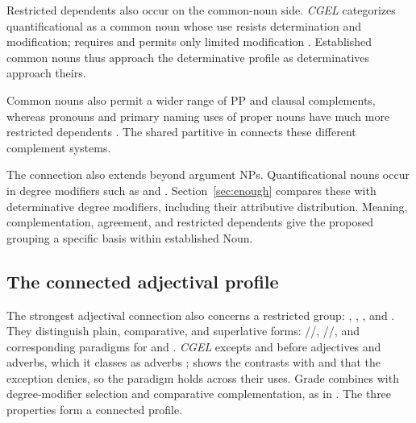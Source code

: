 \documentclass[12pt]{article}
\begin{document}
Restricted dependents also occur on the common-noun side. \textit{CGEL} categorizes quantificational  as a common noun whose use resists determination and modification;  requires  and permits only limited modification \citep[349--350]{huddleston2002}. Established common nouns thus approach the determinative profile as determinatives approach theirs.

Common nouns also permit a wider range of PP and clausal complements, whereas pronouns and primary naming uses of proper nouns have much more restricted dependents \citep[429--430, 439--443, 517--521]{huddleston2002}. The shared partitive in  connects these different complement systems.

The connection also extends beyond argument NPs. Quantificational nouns occur in degree modifiers such as  and  \citep[549--550]{huddleston2002}. Section~\ref{sec:enough} compares these with determinative degree modifiers, including their attributive distribution. Meaning, complementation, agreement, and restricted dependents give the proposed grouping a specific basis within established Noun.

\subsection{The connected adjectival profile}\label{sec:adjectival-profile}

The strongest adjectival connection also concerns a restricted group: , , , and . They distinguish plain, comparative, and superlative forms: /\allowbreak{}/\allowbreak{}, /\allowbreak{}/\allowbreak{}, and corresponding paradigms for  and  \citep[393--395]{huddleston2002}. \textit{CGEL} excepts  and  before adjectives and adverbs, which it classes as adverbs \citep[395, 1123]{huddleston2002}; \textcite{reynolds2024why} shows the contrasts with  and  that the exception denies, so the paradigm holds across their uses. Grade combines with degree-modifier selection and comparative complementation, as in . The three properties form a connected profile.
\end{document}
